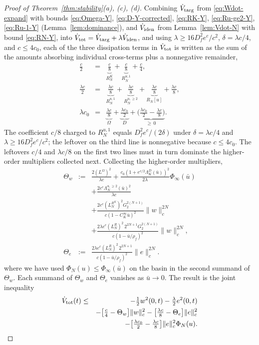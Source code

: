 \documentclass[journal,twoside,web]{ieeecolor}
\begin{document}
\begin{proof}[Proof of Theorem~\ref{thm:stability}(a), (c), (d)]
Combining $\dot V_{\rm targ}$ from \eqref{eq:Wdot-expand} with bounds \eqref{eq:Omega-Y}, \eqref{eq:D-Y-corrected}, \eqref{eq:RK-Y}, \eqref{eq:Ru-ge2-Y}, \eqref{eq:Ru-1-Y} (Lemma~\ref{lem:dominance}), and $\dot V_{\rm iden}$ from Lemma~\ref{lem:Vdot-N} with bound \eqref{eq:RN-Y}, into $\dot V_{\rm tot}=\dot V_{\rm targ}+\lambda\dot V_{\rm iden}$, and using $\lambda\ge 16 D_f^2 e^c/c^2$, $\delta=\lambda c/4$, and $c\le 4c_0$, each of the three dissipation terms in $\dot V_{\rm tot}$ is written as the sum of the amounts absorbing individual cross-terms plus a nonnegative remainder,
\begin{eqnarray}
\tfrac{c}{2} &=& \underbrace{\tfrac{c}{8}}_{R^K_N}+\underbrace{\tfrac{c}{8}}_{R^{u,1}_N}+\tfrac{c}{4}, \label{eq:dissip-w}\\
\tfrac{\lambda c}{2} &=& \underbrace{\tfrac{\lambda c}{8}}_{R^{u,1}_N}+\underbrace{\tfrac{\lambda c}{8}}_{R^{u,\ge 2}_N}+\underbrace{\tfrac{\lambda c}{8}}_{R_N[u]}+\tfrac{\lambda c}{8}, \label{eq:dissip-e}\\
\lambda c_0 &=& \underbrace{\tfrac{\lambda c}{8}}_{\Omega}+\underbrace{\tfrac{\lambda c_0}{2}}_{D}+\underbrace{\bigl(\tfrac{\lambda c_0}{2}-\tfrac{\lambda c}{8}\bigr)}_{\ge\,0}. \label{eq:dissip-ePhi}
\end{eqnarray}
The coefficient $c/8$ charged to $R^{u,1}_N$ equals $D_f^2 e^c/(2\delta)$ under $\delta=\lambda c/4$ and $\lambda\ge 16 D_f^2 e^c/c^2$; the leftover on the third line is nonnegative because $c\le 4c_0$. The leftovers $c/4$ and $\lambda c/8$ on the first two lines must in turn dominate the higher-order multipliers collected next.
Collecting the higher-order multipliers,
\begin{eqnarray}
\Theta_w &:=& \frac{2(L^\Omega)^2}{\lambda c}+\frac{c_0(1+e^{c/2}\Lambda^D_K(\bar u))^2}{2\lambda}\Phi_\infty(\bar u) \nonumber\\
&& +\frac{2 e^c\Lambda^{u,\ge 2}_N(\bar u)^2}{\lambda c} \nonumber\\
&& +\frac{2e^c(L^{R^K}_N)^2 G_2^{2(N+1)}}{c(1-C_K^\infty\bar u)^2}\|w\|_c^{2N} \nonumber\\
&& +\frac{2\lambda e^c(L^R_N)^2\,2^{2N+1}G_2^{2(N+1)}}{c(1-\bar u/\rho_f)^2}\|w\|_c^{2N}, \label{eq:Theta-W}\\
\Theta_e &:=& \frac{2\lambda e^c(L^R_N)^2\,2^{2N+1}}{c(1-\bar u/\rho_f)^2}\|e\|_c^{2N}. \label{eq:Theta-E}
\end{eqnarray}
where we have used $\Phi_N(u)\le\Phi_\infty(\bar u)$ on the basin in the second summand of $\Theta_w$. Each summand of $\Theta_w$ and $\Theta_e$ vanishes as $\bar u\to 0$. The result is the joint inequality
\begin{eqnarray}
\dot V_{\rm tot}(t) &\le& -\tfrac12 w^2(0,t)-\tfrac{\lambda}{2}e^2(0,t) \nonumber\\
&& -\bigl[\tfrac{c}{4}-\Theta_w\bigr]\|w\|_c^2-\bigl[\tfrac{\lambda c}{8}-\Theta_e\bigr]\|e\|_c^2 \nonumber\\
&& -\bigl[\tfrac{\lambda c_0}{2}-\tfrac{\lambda c}{8}\bigr]\|e\|_c^2\Phi_N(u). \label{eq:Udot-final}
\end{eqnarray}


\end{proof}
\end{document}
